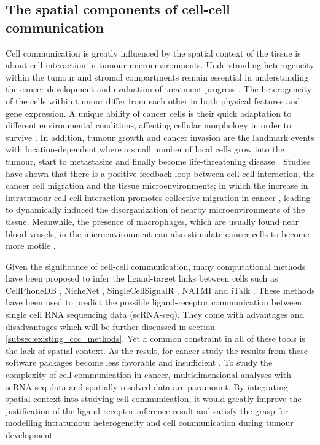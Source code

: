 \subsection{The spatial components of cell-cell communication}

Cell communication is greatly influenced by the spatial context of the tissue is about cell interaction in tumour microenvironments. Understanding heterogeneity within the tumour and stromal compartments remain essential in understanding the cancer development and evaluation of treatment progress \cite{pages2010immune}. The heterogeneity of the cells within tumour differ from each other in both physical features and gene expression. A unique ability of cancer cells is their quick adaptation to different environmental conditions, affecting cellular morphology in order to survive \cite{clark2015modes}. In addition, tumour growth and cancer invasion are the landmark events with location-dependent where a small number of local cells  grow into the tumour, start to metastasize and finally become life-threatening disease \cite{friedl2011cancer}. Studies have shown that there is a positive feedback loop between cell-cell interaction, the cancer cell migration and the tissue microenvironments; in which the increase in intratumour cell-cell interaction promotes collective migration in cancer \cite{friedl2011cancer, whiteside2008tumor}, leading to dynamically induced the disorganization of nearby microenvironments of the tissue\cite{friedl2012classifying, canel2013cadherin, almendro2013cellular, roussos2011chemotaxis, zervantonakis2012three}. Meanwhile, the presence of macrophages, which are usually found near blood vessels, in the microenvironment can also stimulate cancer cells to become more motile \cite{wyckoff2007direct}.  

Given the significance of cell-cell communication, many computational methods have been proposed to infer the ligand-target links between cells such as CellPhoneDB \cite{efremova2020cellphonedb}, NicheNet \cite{browaeys2020nichenet}, SingleCellSignalR \cite{cabello2020singlecellsignalr}, NATMI \cite{hou2020predicting} and iTalk \cite{wang2019italk}. These methods have been  used to predict the possible ligand-receptor communication between single cell RNA sequencing data (scRNA-seq). They come with advantages and disadvantages which will be further discussed in section \ref{subsec:existing_ccc_methods}. Yet a common constraint in all of these tools is the lack of spatial context. As the result, for cancer study the results from these software packages become less favorable and insufficient \cite{de2020unraveling}. To study the complexity of cell communication in cancer, multidimensional analyses with scRNA-seq data and spatially-resolved data are paramount. By integrating spatial context into studying cell communication, it would greatly improve the justification of the ligand receptor inference result and satisfy the grasp for modelling intratumour heterogeneity and cell communication during tumour development \cite{crosetto2015spatially, pages2010immune, marusyk2012intra,bedard2013tumour}.


